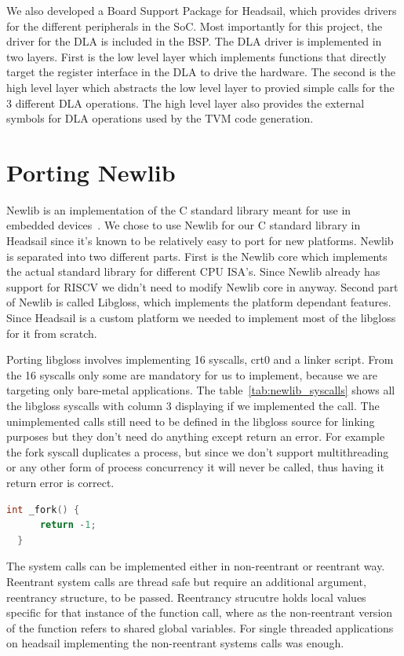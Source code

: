 \documentclass[12pt,a4paper,english
]{tunithesis}
\begin{document}
We also developed a Board Support Package for Headsail, which provides drivers for the different peripherals in the SoC. Most importantly for this project, the driver for the DLA is included in the BSP.
The DLA driver is implemented in two layers. First is the low level layer which implements functions that directly target the register interface in the DLA to drive the hardware. The second is the high level layer which abstracts the low level layer to provied simple calls for the 3 different DLA operations. The high level layer also provides the external symbols for DLA operations used by the TVM code generation.


\section{Porting Newlib}
Newlib is an implementation of the C standard library meant for use in embedded devices~\parencite{newlib}. We chose to use Newlib for our C standard library in Headsail since it's known to be relatively easy to port for new platforms. Newlib is separated into two different parts. First is the Newlib core which implements the actual standard library for different CPU ISA's. Since Newlib already has support for RISCV we didn't need to modify Newlib core in anyway. Second part of Newlib is called Libgloss, which implements the platform dependant features. Since Headsail is a custom platform we needed to implement most of the libgloss for it from scratch.

Porting libgloss involves implementing 16 syscalls, crt0 and a linker script. From the 16 syscalls only some are mandatory for us to implement, because we are targeting only bare-metal applications. The table~\ref{tab:newlib_syscalls} shows all the libgloss syscalls with column 3 displaying if we implemented the call. The unimplemented calls still need to be defined in the libgloss source for linking purposes but they don't need do anything except return an error. For example the fork syscall duplicates a process, but since we don't support multithreading or any other form of process concurrency it will never be called, thus having it return error is correct.

\begin{lstlisting}[language=C, caption={Minimal implmentation of the fork() syscall in Newlib Libgloss}]
  int _fork() {
      return -1;
  }
\end{lstlisting}

The system calls can be implemented either in non-reentrant or reentrant way. Reentrant system calls are thread safe but require an additional argument, reentrancy structure, to be passed. Reentrancy strucutre holds local values specific for that instance of the function call, where as the non-reentrant version of the function refers to shared global variables. For single threaded applications on headsail implementing the non-reentrant systems calls was enough.~\parencite{bennett2010porting}
\end{document}
